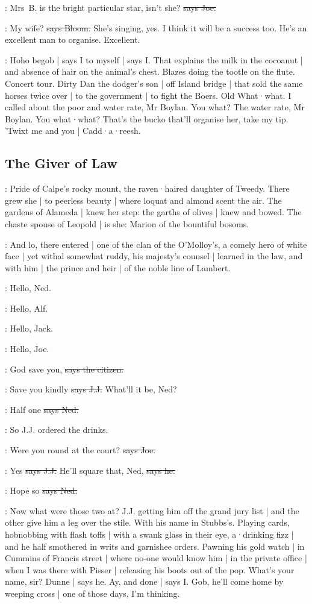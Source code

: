 \joe:
Mrs~B. is the bright particular star,
isn't she?
\sout{says Joe.}

\Bloom:
My wife?
\sout{says Bloom.}
She's singing,
yes.
I think it will be a success too.
He's an excellent man to organise.
Excellent.

\Nq:
Hoho begob |
says I to myself |
says I.
That explains the milk in the cocoanut |
and absence of hair on the animal's chest.
Blazes doing the tootle on the flute.
Concert tour.
Dirty Dan the dodger's son |
off Island bridge |
that sold the same horses twice over |
to the government |
to fight the Boers.
Old What·what.
I called about the poor and water rate,
Mr Boylan.
You what?
The water rate,
Mr Boylan.
You what·what?
That's the bucko that'll organise her,
take my tip.
'Twixt me and you |
Cadd·a·reesh.


\subsection*{The Giver of Law}

:
Pride of Calpe's rocky mount,
the raven·haired daughter of Tweedy.
There grew she |
to peerless beauty |
where loquat and almond scent the air.
The gardens of Alameda |
knew her step:
the garths of olives |
knew and bowed.
The chaste spouse of Leopold |
is she:
Marion of the bountiful bosoms.

:
And lo,
there entered |
one of the clan of the O'Molloy's,
a comely hero of white face |
yet withal somewhat ruddy,
his majesty's counsel |
learned in the law,
and with him |
the prince and heir |
of the noble line of Lambert.

\bergan:
Hello,
Ned.

\lambert:
Hello,
Alf.

\joe:
Hello,
Jack.

\jjom:
Hello,
Joe.

\citizen:
God save you,
\sout{says the citizen.}

\jjom:
Save you kindly
\sout{says J.J.}
What'll it be,
Ned?

\lambert:
Half one
\sout{says Ned.}

\Nq:
So J.J. ordered the drinks.

\joe:
Were you round at the court?
\sout{says Joe.}

\jjom:
Yes
\sout{says J.J.}
He'll square that,
Ned,
\sout{says he.}

\lambert:
Hope so
\sout{says Ned.}

\Nq:
Now what were those two at?
J.J. getting him off the grand jury list |
and the other give him a leg over the stile.
With his name in Stubbs's.
Playing cards,
hobnobbing with flash toffs |
with a swank glass in their eye,
a·drinking fizz |
and he half smothered in writs and garnishee orders.
Pawning his gold watch |
in Cummins of Francis street |
where no-one would know him |
in the private office |
when I was there with Pisser |
releasing his boots out of the pop.
What's your name,
sir?
Dunne |
says he.
Ay,
and done |
says I.
Gob,
he'll come home by weeping cross |
one of those days,
I'm thinking.%

